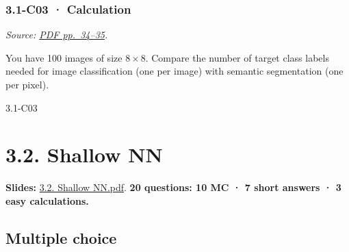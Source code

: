 \noindent\begin{minipage}{\linewidth}

\subsubsection{3.1-C03 · Calculation}\label{c03-calculation-7}

\emph{Source:
\href{../Lecture\%20Slides/3.1.\%20Introduction\%20to\%20Deep\%20Learning.pdf\#page=34}{PDF
pp.~34--35}.}

You have 100 images of size \(8\times8\). Compare the number of target
class labels needed for image classification (one per image) with
semantic segmentation (one per pixel).

\begin{solution}[26mm]{3.1-C03}

\end{solution}
\end{minipage}\par\medskip

\clearpage

\section{3.2. Shallow NN}\label{shallow-nn}

\textbf{Slides:}
\href{../Lecture\%20Slides/3.2.\%20Shallow\%20NN.pdf}{3.2. Shallow
NN.pdf}. \textbf{20 questions: 10 MC · 7 short answers · 3 easy
calculations.}

\subsection{Multiple choice}\label{multiple-choice-8}

